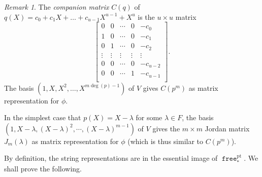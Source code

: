 \documentclass[a4paper]{amsart}
\theoremstyle{plain}
\theoremstyle{definition}
\theoremstyle{remark}
\newtheorem{remark}[theorem]{Remark}
\newcommand{\funct}[1]{\operatorname{\mathtt{#1}}}
\begin{document}
\begin{remark}
The \emph{companion matrix} $C(q)$ of $q(X) = c_0 + c_1X + \ldots + c_{u-1}X^{u-1}+X^u$ is the $u\times u$ matrix 
\[ \begin{bmatrix} 0 & 0 & \cdots & 0 & -c_0 \\ 1 & 0 & \cdots & 0 & -c_1 \\ 0 & 1  & \cdots & 0 & -c_2 \\
\vdots & \vdots & \vdots & \vdots & \vdots\\
0 & 0  &\cdots & 0 & -c_{u-2}\\ 0 & 0  & \cdots & 1 & -c_{u-1} \\\end{bmatrix}.\]
The basis \( (1, X, X^2, \ldots, X^{m \operatorname{deg}(p) - 1}) \) of \( V \) gives \( C(p^m) \) as matrix representation for \( \phi \).

In the simplest case that $p(X) = X-\lambda$ for some $\lambda\in F$, the basis \( (1, X - \lambda, (X - \lambda)^2, \cdots, (X - \lambda)^{m-1} ) \) of \( V \) gives the $m\times m$ Jordan matrix $J_m(\lambda)$ as matrix representation for \( \phi \) (which is thus similar to $C(p^m)$). 
\end{remark}

By definition, the string representations are in the essential image of $\funct{free}^\mathrm{pt}_*$. We shall prove the following. 
\end{document}
